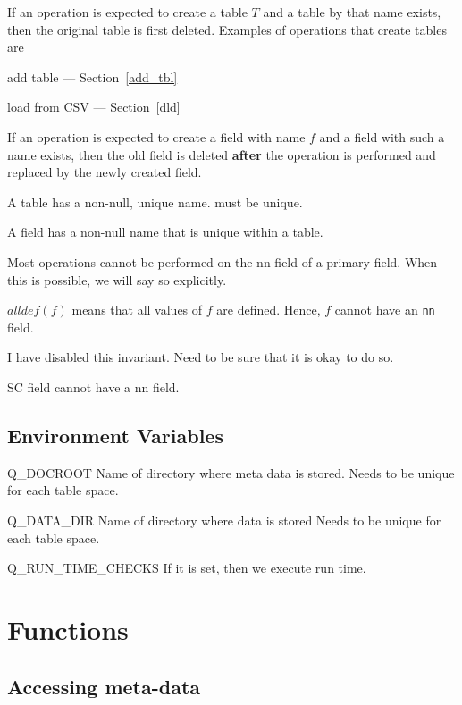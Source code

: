 \documentclass{report}
\begin{document}
\be
\item If an operation is expected to create a table \(T\) and a table
by that name exists, then the original table is first deleted. Examples
of operations that create tables are
\be
\item add table --- Section~\ref{add_tbl}
\item load from CSV --- Section~\ref{dld}
\ee
\item 
If an operation is expected to create a field with name \(f\) and a
field with such a name exists, then the old field is deleted {\bf after}
the operation is performed and replaced by the newly created field. 
\item A table has a non-null, unique name.
must be unique. 
\item A field has a non-null name that is unique within a table.
\item Most operations cannot be performed on the nn field of a primary
field. When this is possible, we will say so explicitly. 
\ee

\begin{notation}
\(alldef(f)\) means that all values of \(f\) are defined. Hence, \(f\)
  cannot have an {\tt nn} field.
\end{notation}

I have disabled this invariant. Need to be sure that it is okay to do
so.
\begin{invariant}
SC field cannot have a nn field.
\end{invariant}

\subsection{Environment Variables}

\bd
\item [Q\_DOCROOT] Name of directory where meta data is stored. 
Needs to be unique for each table space. 
\item [Q\_DATA\_DIR] Name of directory where data is stored
Needs to be unique for each table space. 
\item [Q\_RUN\_TIME\_CHECKS] If it is set, then we execute run time.
\ed


\section{Functions}

\subsection{Accessing meta-data}
\end{document}
